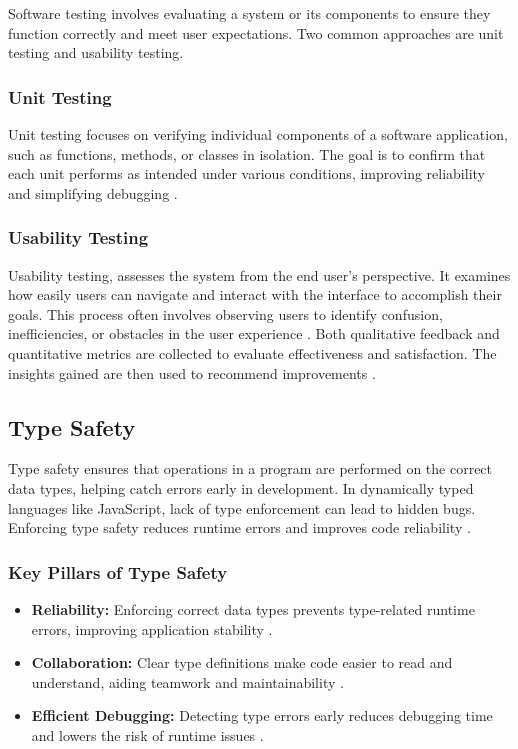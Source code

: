 Software testing involves evaluating a system or its components to ensure they function correctly and meet user expectations. Two common approaches are unit testing and usability testing. \\

\subsubsection*{Unit Testing}

Unit testing focuses on verifying individual components of a software application, such as functions, methods, or classes in isolation. The goal is to confirm that each unit performs as intended under various conditions, improving reliability and simplifying debugging \cite{geeksforgeeks:unit-test}. \\

\subsubsection*{Usability Testing}

Usability testing, assesses the system from the end user’s perspective. It examines how easily users can navigate and interact with the interface to accomplish their goals. This process often involves observing users to identify confusion, inefficiencies, or obstacles in the user experience \cite{geeksforgeeks:user-test}. Both qualitative feedback and quantitative metrics are collected to evaluate effectiveness and satisfaction. The insights gained are then used to recommend improvements \cite{geeksforgeeks:user-test}.

\subsection{Type Safety}
\label{subsec:type-safety}

Type safety ensures that operations in a program are performed on the correct data types, helping catch errors early in development. In dynamically typed languages like JavaScript, lack of type enforcement can lead to hidden bugs. Enforcing type safety reduces runtime errors and improves code reliability \cite{dev:type-safety}.

\subsubsection*{Key Pillars of Type Safety}
\label{subsubsec:type-safety-pillars}

\begin{itemize}
\item \textbf{Reliability:} Enforcing correct data types prevents type-related runtime errors, improving application stability \cite{dev:type-safety}.

\item \textbf{Collaboration:} Clear type definitions make code easier to read and understand, aiding teamwork and maintainability \cite{dev:type-safety}.

\item \textbf{Efficient Debugging:} Detecting type errors early reduces debugging time and lowers the risk of runtime issues \cite{dev:type-safety}.
\end{itemize}
